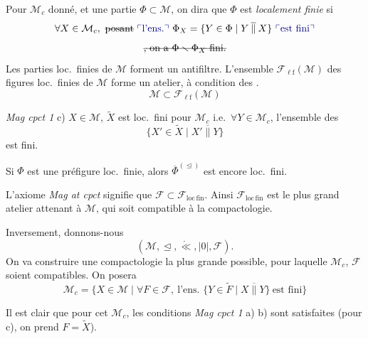 \documentclass[11pt,a4paper]{article}
\begin{document}
Pour $\mathcal{M}_c$ donné, et une partie $\Phi\subset\mathcal{M}$, on dira que $\Phi$ est \textit{localement finie} si 
\[
  \forall X\in\mathcal{M}_c,\ \text{\struck{posant}}\ \text{\add{l'ens.}}\ \Phi_X=\{Y\in\Phi\mid Y\mathbin{\overline{\|}}X\}\ \text{\add{est fini}}
\]
\[
  \text{\struck{, on a $\Phi\smallsetminus\Phi_X$ fini.}}
\]
Les parties loc.\ finies de $\mathcal{M}$ forment un antifiltre. L'ensemble  $\mathcal{F}_{\mathrm{\ell f}}(\mathcal{M})$ des figures loc.\ finies de $\mathcal{M}$ forme un atelier, à condition   des   . 
\[
  \mathcal{M}\subset\mathcal{F}_{\mathrm{\ell f}}(\mathcal{M})
\]

\textit{Mag cpct 1} c) \struck{\ill{}} $X\in\mathcal{M}$, $\widetilde{X}$ est loc.\ fini pour $\mathcal{M}_c$ i.e.\ $\forall Y\in\mathcal{M}_c$, l'ensemble des
\[
  \{X'\in\widetilde{X}\mid X'\mathbin{\overline{\|}}Y\}
\]
est fini.

Si $\Phi$ est une préfigure loc.\ finie, alors $\overline{\Phi}^{(\trianglelefteq)}$ est encore loc.\ fini.

L'axiome \textit{Mag at cpct} signifie que $\mathcal{F}\subset\mathcal{F}_{\mathrm{loc\,fin}}$. Ainsi $\mathcal{F}_{\mathrm{loc\,fin}}$ est le plus grand atelier attenant à $\mathcal{M}$, qui soit compatible à la compactologie.

Inversement, donnons-nous
\[
  (\mathcal{M},\trianglelefteq,\mathring{\ll},|0|,\mathcal{F}).
\]
On va construire une  compactologie la plus grande possible, pour laquelle $\mathcal{M}_c$, $\mathcal{F}$ soient compatibles. On posera
\[
  \mathcal{M}_c=\{X\in\mathcal{M}\mid \forall F\in\mathcal{F},\ \text{l'ens. } \{Y\in\widetilde{F}\mid X\mathbin{\overline{\|}}Y\}\ \text{est fini}\}
\]

Il est clair que pour cet $\mathcal{M}_c$, les conditions \textit{Mag cpct 1} a) b)   sont satisfaites (pour c), on prend $F=\widetilde{X}$).
\end{document}
